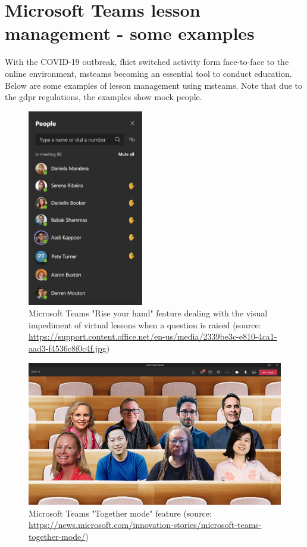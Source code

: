 \chapter{Microsoft Teams lesson management - some examples}\label{appendices:ms_teams}

With the COVID-19 outbreak, \acrshort{fhict} switched activity form face-to-face to the online environment, \acrshort{msteams} becoming an essential tool to conduct education. Below are some examples of lesson management using \acrshort{msteams}.
Note that due to the \acrfull{gdpr} regulations, the examples show mock people.

\begin{figure}[h]
    \centering
    \includegraphics[width = 0.45\textwidth]{appendices/ms_teams/ms_teams_images/mircosoft_rise_your_hand.jpg}
    \caption{Microsoft Teams "Rise your hand" feature dealing with the visual impediment of virtual lessons when a question is raised (source: \url{https://support.content.office.net/en-us/media/2339be3c-e810-4ca1-aad3-f4536c8f0c4f.jpg})
    }
    \label{fig:my_label}
\end{figure}

\begin{figure}
    \centering
    \includegraphics[width=\textwidth]{appendices/ms_teams/ms_teams_images/mircosoft_together_mode.jpg}
    \caption{Microsoft Teams "Together mode" feature (source: \url{https://news.microsoft.com/innovation-stories/microsoft-teams-together-mode/})}
    \label{fig:my_label}
\end{figure}

